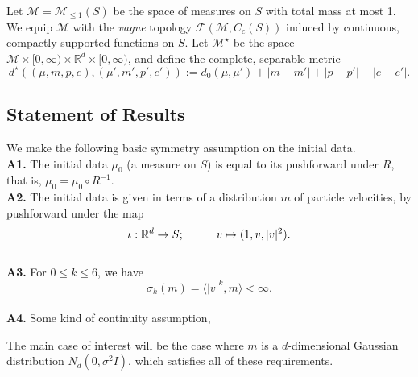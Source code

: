 \begin{definition} Let $\mathcal{M}=\mathcal{M}_{\le 1}(S)$ be the space of measures on $S$ with total mass at most 1. We equip $\mathcal{M}$ with the \emph{vague} topology $\mathcal{F}(\mathcal{M}, C_c(S))$ induced by continuous, compactly supported functions on $S$. Let $\mathcal{M}^\star$ be the space $\mathcal{M}\times [0,\infty)\times \mathbb{R}^d\times [0, \infty)$, and define the complete, separable metric \begin{equation} d^\star\left((\mu, m, p, e), (\mu', m',p',e')\right):=d_0(\mu, \mu')+|m-m'|+|p-p'|+|e-e'|. \end{equation} \end{definition}

\subsection{Statement of Results}\label{sec: results}

We make the following basic symmetry assumption on the initial data.
\\\textbf{A1.} The initial data $\mu_0$ (a measure on $S$) is equal to its pushforward under $R$, that is, $\mu_0 = \mu_0 \circ R^{-1}$.
\\ \textbf{A2.} The initial data is given in terms of a distribution $m$ of particle velocities, by pushforward under the map
\begin{equation}
    \iota: \mathbb{R}^d \rightarrow S; \hspace{1cm} v\mapsto (1, v, |v|^2).
\end{equation}
\\ \textbf{A3.} For $0\leq k\leq 6$, we have
\begin{equation}
    \sigma_k(m)=\langle |v|^k, m\rangle <\infty.
\end{equation}
\\ \textbf{A4.} Some kind of continuity assumption, 

The main case of interest will be the case where $m$ is a $d$-dimensional Gaussian distribution $N_d(0, \sigma^2I)$, which satisfies all of these requirements.

